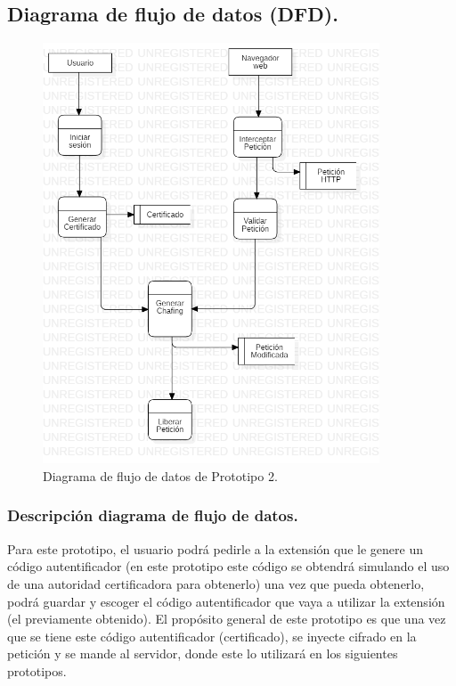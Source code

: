 \documentclass[12pt, a4paper, titlepage]{report}
\begin{document}
			\subsection{Diagrama de flujo de datos (DFD).}
			    \begin{figure}[htb]
					\begin{center}
			    	\includegraphics[width=10cm]{./imagenes/Desarrollo/Prototipo_2/DFD_P2.png}
						\caption{Diagrama de flujo de datos de Prototipo 2.}
					\end{center}
				\end{figure}
			    \newpage
			    
			    \subsubsection{Descripción diagrama de flujo de datos.}
			    Para este prototipo, el usuario podrá pedirle a la extensión que le genere un código autentificador (en este prototipo este código se obtendrá simulando el uso de una autoridad certificadora para obtenerlo) una vez que pueda obtenerlo, podrá guardar y escoger el código autentificador que vaya a utilizar la extensión (el previamente obtenido). El propósito general de este prototipo es que una vez que se tiene este código autentificador (certificado), se inyecte cifrado en la petición y se mande al servidor, donde este lo utilizará en los siguientes prototipos. 
			    
\end{document}
